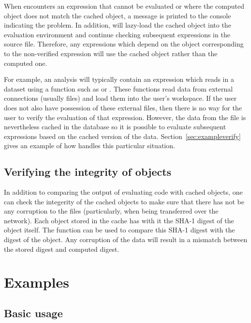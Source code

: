 \documentclass[nojss]{jss}
\begin{document}
When  encounters an expression that cannot be
evaluated or where the computed object does not match the cached
object, a message is printed to the console indicating the problem.
In addition,  will lazy-load the cached object into
the evaluation environment and continue checking subsequent
expressions in the source file.  Therefore, any expressions which
depend on the object corresponding to the non-verified expression will
use the cached object rather than the computed one.

For example, an analysis will typically contain an expression which
reads in a dataset using a function such as  or
.  These functions read data from external
connections (usually files) and load them into the user's workspace.
If the user does not also have possession of these external files,
then there is no way for the user to verify the evaluation of that
expression.  However, the data from the file is nevertheless cached in
the database so it is possible to evaluate subsequent expressions
based on the cached version of the data.
Section~\ref{sec:exampleverify} gives an example of how
 handles this particular situation.


\subsection{Verifying the integrity of objects}

In addition to comparing the output of evaluating code with cached
objects, one can check the integerity of the cached objects to make
sure that there has not be any corruption to the files (particularly,
when being transferred over the network).  Each object stored in the
cache has with it the SHA-1 digest of the object itself.  The
 function can be used to compare this SHA-1 digest
with the digest of the object.  Any corruption of the data will result
in a mismatch between the stored digest and computed digest.

\section{Examples}
\label{sec:examples}

\subsection{Basic usage}
\end{document}
